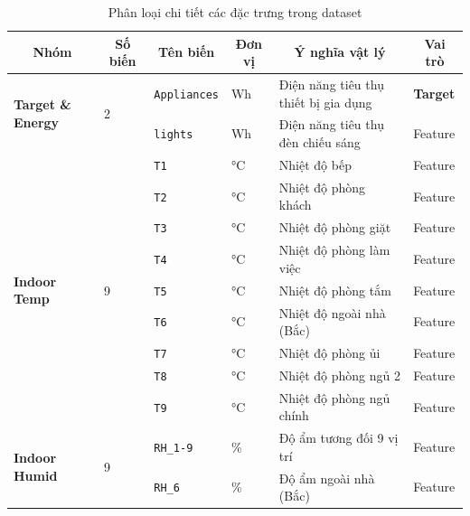 \begin{table}[H]
    \centering
    \caption{Phân loại chi tiết các đặc trưng trong dataset}
    \label{tab:feature_taxonomy}
    \renewcommand{\arraystretch}{1.3}
    \footnotesize

    \begin{tabular}{|
        p{2.5cm}|
        p{1.4cm}|
        p{2.3cm}|
        p{1.2cm}|
        p{4.5cm}|
        p{1.8cm}|
    }
        \hline
        \multicolumn{1}{|c|}{\textbf{Nhóm}} &
        \multicolumn{1}{c|}{\textbf{Số biến}} &
        \multicolumn{1}{c|}{\textbf{Tên biến}} &
        \multicolumn{1}{c|}{\textbf{Đơn vị}} &
        \multicolumn{1}{c|}{\textbf{Ý nghĩa vật lý}} &
        \multicolumn{1}{c|}{\textbf{Vai trò}} \\
        \hline

        \multirow{2}{2.5cm}{\textbf{Target \& Energy}} 
        & \multirow{2}{1.4cm}{2} 
        & \texttt{Appliances} & Wh & Điện năng tiêu thụ thiết bị gia dụng & \textbf{Target} \\
        \cline{3-6}
        & & \texttt{lights} & Wh & Điện năng tiêu thụ đèn chiếu sáng & Feature \\
        \hline

        \multirow{9}{2.5cm}{\textbf{Indoor Temp}} 
        & \multirow{9}{1.4cm}{9} 
        & \texttt{T1} & °C & Nhiệt độ bếp & Feature \\
        \cline{3-6}
        & & \texttt{T2} & °C & Nhiệt độ phòng khách & Feature \\
        \cline{3-6}
        & & \texttt{T3} & °C & Nhiệt độ phòng giặt & Feature \\
        \cline{3-6}
        & & \texttt{T4} & °C & Nhiệt độ phòng làm việc & Feature \\
        \cline{3-6}
        & & \texttt{T5} & °C & Nhiệt độ phòng tắm & Feature \\
        \cline{3-6}
        & & \texttt{T6} & °C & Nhiệt độ ngoài nhà (Bắc) & Feature \\
        \cline{3-6}
        & & \texttt{T7} & °C & Nhiệt độ phòng ủi & Feature \\
        \cline{3-6}
        & & \texttt{T8} & °C & Nhiệt độ phòng ngủ 2 & Feature \\
        \cline{3-6}
        & & \texttt{T9} & °C & Nhiệt độ phòng ngủ chính & Feature \\
        \hline

        \multirow{2}{2.5cm}{\textbf{Indoor Humid}} 
        & \multirow{2}{1.4cm}{9} 
        & \texttt{RH\_1-9} & \% & Độ ẩm tương đối 9 vị trí & Feature \\
        \cline{3-6}
        & & \texttt{RH\_6} & \% & Độ ẩm ngoài nhà (Bắc) & Feature \\
        \hline


\end{tabular}
\end{table}
